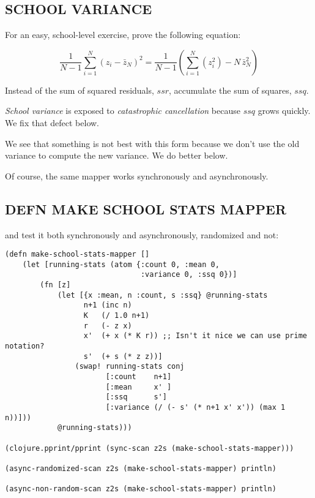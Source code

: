 \documentclass[10pt,oneside,x11names]{article}
\begin{document}
\subsection{SCHOOL VARIANCE}
\label{school-variance}
For an easy, school-level exercise, prove the following equation:

$$\frac{1}{N-1}\sum\limits_{i=1}^{N}\left({z_i-\bar{z}_N}\right)^2 =
\frac{1}{N-1}\left(\sum\limits_{i=1}^{N}\left(z_i^2\right)-N\,{\bar{z}_N^2}\right)$$

Instead of the sum of squared residuals, \(ssr\), accumulate the sum of
squares, \(ssq\).

\emph{School variance} is exposed to \emph{catastrophic cancellation} because
\(ssq\) grows quickly. We fix that defect below.

We see that something is not best with this form because we don't use
the old variance to compute the new variance. We do better below.

Of course, the same mapper works synchronously and asynchronously.

\subsection{DEFN MAKE SCHOOL STATS MAPPER}
\label{make-school-stats-mapper}
and test it both synchronously and asynchronously, randomized and not:

\begin{verbatim}
(defn make-school-stats-mapper []
    (let [running-stats (atom {:count 0, :mean 0,
                               :variance 0, :ssq 0})]
        (fn [z]
            (let [{x :mean, n :count, s :ssq} @running-stats
                  n+1 (inc n)
                  K   (/ 1.0 n+1)
                  r   (- z x)
                  x'  (+ x (* K r)) ;; Isn't it nice we can use prime notation?
                  s'  (+ s (* z z))]
                (swap! running-stats conj
                       [:count    n+1]
                       [:mean     x' ]
                       [:ssq      s']
                       [:variance (/ (- s' (* n+1 x' x')) (max 1 n))]))
            @running-stats)))

(clojure.pprint/pprint (sync-scan z2s (make-school-stats-mapper)))

(async-randomized-scan z2s (make-school-stats-mapper) println)

(async-non-random-scan z2s (make-school-stats-mapper) println)
\end{verbatim}
\end{document}
